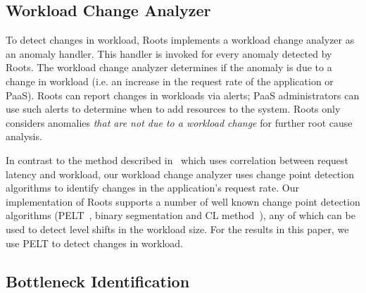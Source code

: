 
\subsection{Workload Change Analyzer}

To detect changes in workload, Roots implements a workload change analyzer as an anomaly handler. 
This handler is invoked for every anomaly detected by Roots.
The workload change analyzer determines if the anomaly is due to a change in workload (i.e.
an increase in the request rate of the application or PaaS).  Roots can report
changes in workloads via alerts; PaaS administrators can use such alerts to determine when to
add resources to the system.
Roots only considers anomalies \textit{that are not due to a workload change} for further root
cause analysis.

In contrast to the method described 
in~\cite{Magalhaes:2010:DPA:1906485.1906774,
Magalhaes:2011:RAP:1982185.1982234} which uses correlation between request
latency and workload, our 
workload change analyzer uses change point detection algorithms to identify changes in
the application's request rate. 
Our implementation of Roots supports a number of well known change point
detection algorithms (PELT~\cite{doi:10.1080/01621459.2012.737745}, binary segmentation 
and CL method~\cite{chen1993joint}), any of which can be used to detect level shifts in the
workload size.  For the results in this paper, we use PELT to detect changes in workload.

\subsection{Bottleneck Identification}

